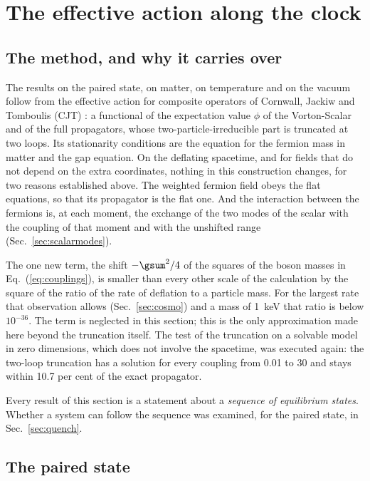\section{The effective action along the clock}
\label{sec:cjt}

\subsection{The method, and why it carries over}

The results on the paired state, on matter, on temperature and on the
vacuum follow from the effective action for composite operators of Cornwall, Jackiw and Tomboulis (CJT)
\cite{CJT1974}: a functional of the expectation value $\phi$ of the Vorton-Scalar and of the full
propagators, whose two-particle-irreducible part is truncated at two loops. Its stationarity
conditions are the equation for the fermion mass in matter and the gap equation. On the deflating
spacetime, and for fields that do not depend on the extra coordinates, nothing in this construction
changes, for two reasons established above. The weighted fermion field obeys the flat equations, so
that its propagator is the flat one. And the interaction between the fermions is, at each moment,
the exchange of the two modes of the scalar with the coupling of that moment and with the unshifted
range (Sec.~\ref{sec:scalarmodes}).

The one new term, the shift $-\gsum^{2}/4$ of the squares of the boson masses in
Eq.~(\ref{eq:couplings}), is smaller than every other scale of the calculation by the square of the
ratio of the rate of deflation to a particle mass. For the largest rate that observation allows
(Sec.~\ref{sec:cosmo}) and a mass of 1~keV that ratio is below $10^{-36}$. The term is neglected in
this section; this is the only approximation made here beyond the truncation itself. The test
of the truncation on a solvable model in zero dimensions, which does not involve the spacetime, was
executed again: the two-loop truncation has a solution for every coupling from 0.01 to 30 and stays
within 10.7 per cent of the exact propagator.

Every result of this section is a statement about a \emph{sequence of equilibrium states}. Whether a
system can follow the sequence was examined, for the paired state, in Sec.~\ref{sec:quench}.

\subsection{The paired state}

